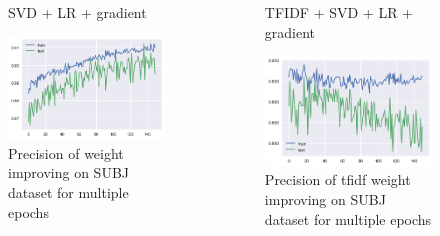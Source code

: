 \documentclass[xcolor={table}]{beamer}
\begin{document}
\begin{frame}{}
    \begin{columns}
                   \begin{figure}[H]
                    \centering
                    \caption*{SVD + LR + gradient}
                    \includegraphics[height=0.4\textheight]{images/SUBJDataset_grad.png}
                    \caption{Precision of weight improving on SUBJ dataset for multiple epochs}
                \end{figure}

                \begin{figure}[H]
                    \centering
                    \caption*{TFIDF + SVD + LR + gradient}
                    \includegraphics[height=0.4\textheight]{images/SUBJDataset_tfidf_grad.png}
                    \caption{Precision of tfidf weight improving on SUBJ dataset for multiple epochs}
                \end{figure}
    \end{columns}                
\end{frame} 
\end{document}

